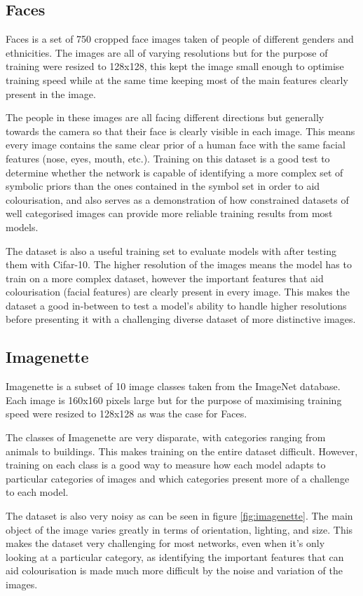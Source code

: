 \documentclass{l4proj}
\begin{document}
\subsection{Faces}
Faces is a set of 750 cropped face images taken of people of different genders and ethnicities. The images are all of varying resolutions but for the purpose of training were resized to 128x128, this kept the image small enough to optimise training speed while at the same time keeping most of the main features clearly present in the image.

The people in these images are all facing different directions but generally towards the camera so that their face is clearly visible in each image. This means every image contains the same clear prior of a human face with the same facial features (nose, eyes, mouth, etc.). Training on this dataset is a good test to determine whether the network is capable of identifying a more complex set of symbolic priors than the ones contained in the symbol set in order to aid colourisation, and also serves as a demonstration of how constrained datasets of well categorised images can provide more reliable training results from most models.

The dataset is also a useful training set to evaluate models with after testing them with Cifar-10. The higher resolution of the images means the model has to train on a more complex dataset, however the important features that aid colourisation (facial features) are clearly present in every image. This makes the dataset a good in-between to test a model's ability to handle higher resolutions before presenting it with a challenging diverse dataset of more distinctive images.

\subsection{Imagenette}
Imagenette is a subset of 10 image classes taken from the ImageNet database. Each image is 160x160 pixels large but for the purpose of maximising training speed were resized to 128x128 as was the case for Faces. 

The classes of Imagenette are very disparate, with categories ranging from animals to buildings. This makes training on the entire dataset difficult. However, training on each class is a good way to measure how each model adapts to particular categories of images and which categories present more of a challenge to each model. 

The dataset is also very noisy as can be seen in figure \ref{fig:imagenette}. The main object of the image varies greatly in terms of orientation, lighting, and size. This makes the dataset very challenging for most networks, even when it's only looking at a particular category, as identifying the important features that can aid colourisation is made much more difficult by the noise and variation of the images.
\end{document}
